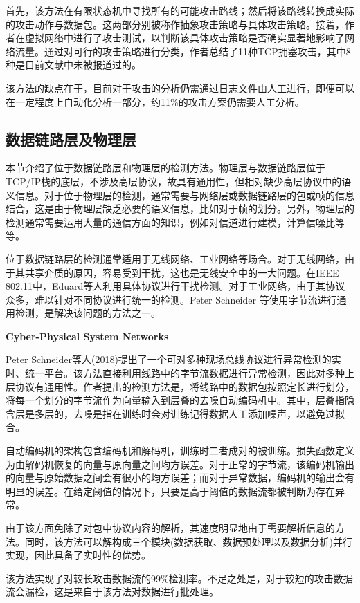 \documentclass[12pt]{article} %
\begin{document}
首先，该方法在有限状态机中寻找所有的可能攻击路线；然后将该路线转换成实际的攻击动作与数据包。这两部分别被称作抽象攻击策略与具体攻击策略。接着，作者在虚拟网络中进行了攻击测试，以判断该具体攻击策略是否确实显著地影响了网络流量。通过对可行的攻击策略进行分类，作者总结了11种TCP拥塞攻击，其中8种是目前文献中未被报道过的。

该方法的缺点在于，目前对于攻击的分析仍需通过日志文件由人工进行，即便可以在一定程度上自动化分析一部分，约11\%的攻击方案仍需要人工分析。

\subsection{数据链路层及物理层}
\label{phy}

本节介绍了位于数据链路层和物理层的检测方法。物理层与数据链路层位于TCP/IP栈的底层，不涉及高层协议，故具有通用性，但相对缺少高层协议中的语义信息。对于位于物理层的检测，通常需要与网络层或数据链路层的包或帧的信息结合，这是由于物理层缺乏必要的语义信息，比如对于帧的划分。另外，物理层的检测通常需要运用大量的通信方面的知识，例如对信道进行建模，计算信噪比等等。

位于数据链路层的检测通常适用于无线网络、工业网络等场合。对于无线网络，由于其共享介质的原因，容易受到干扰，这也是无线安全中的一大问题。在IEEE 802.11中，Eduard等人利用具体协议进行干扰检测。对于工业网络，由于其协议众多，难以针对不同协议进行统一的检测。Peter Schneider 等使用字节流进行通用检测，是解决该问题的方法之一。

\textbf{Cyber-Physical System Networks}

Peter Schneider等人(2018)提出了一个可对多种现场总线协议进行异常检测的实时、统一平台。该方法直接利用线路中的字节流数据进行异常检测，因此对多种上层协议有通用性。作者提出的检测方法是，将线路中的数据包按照定长进行划分，将每一个划分的字节流作为向量输入到层叠的去噪自动编码机中。其中，层叠指隐含层是多层的，去噪是指在训练时会对训练记得数据人工添加噪声，以避免过拟合。

自动编码机的架构包含编码机和解码机，训练时二者成对的被训练。损失函数定义为由解码机恢复的向量与原向量之间均方误差。对于正常的字节流，该编码机输出的向量与原始数据之间会有很小的均方误差；而对于异常数据，编码机的输出会有明显的误差。在给定阈值的情况下，只要是高于阈值的数据流都被判断为存在异常。

由于该方面免除了对包中协议内容的解析，其速度明显地由于需要解析信息的方法。同时，该方法可以解构成三个模块(数据获取、数据预处理以及数据分析)并行实现，因此具备了实时性的优势。

该方法实现了对较长攻击数据流的99\%检测率。不足之处是，对于较短的攻击数据流会漏检，这是来自于该方法对数据进行批处理。
\end{document}
